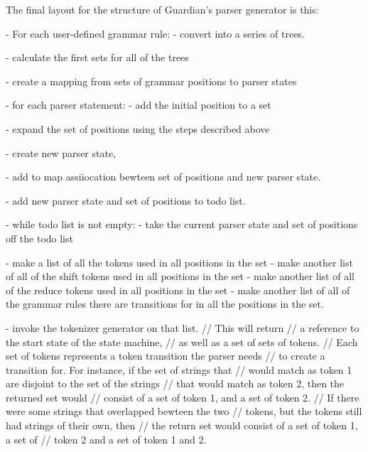 {{		The final layout for the structure of Guardian's parser generator is
		this:

		- For each user-defined grammar rule:
			- convert into a series of trees.

		- calculate the first sets for all of the trees

		- create a mapping from sets of grammar positions to parser states

		- for each parser statement:
			- add the initial position to a set
			
			- expand the set of positions using the steps described above
			
			- create new parser state,
			
			- add to map assiiocation bewteen set of positions and new parser state.
			
			- add new parser state and set of positions to todo list.

		- while todo list is not empty:
			- take the current parser state and set of positions off the todo list
			
			- make a list of all the tokens used in all positions in the set
			- make another list of all of the shift tokens used in all positions in the set
			- make another list of all of the reduce tokens used in all positions in the set
			- make another list of all of the grammar rules there are transitions
				for in all the positions in the set.
			
			- invoke the tokenizer generator on that list.
				// This will return
				// a reference to the start state of the state machine,
				// as well as a set of sets of tokens.
				// Each set of tokens represents a token transition the parser needs
				// to create a transition for. For instance, if the set of strings that
				// would match as token 1 are disjoint to the set of the strings
				// that would match as token 2, then the returned set would
				// consist of a set of token 1, and a set of token 2.
				// If there were some strings that overlapped bewteen the two
				// tokens, but the tokens still had strings of their own, then
				// the return set would consist of a set of token 1, a set of
				// token 2 and a set of token 1 and 2.
			
}}
